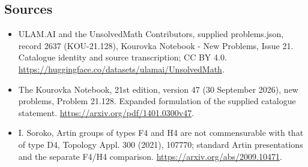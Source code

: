 \documentclass[11pt,a4paper]{article}
\begin{document}
\subsection{Sources}
\begin{itemize}
\item[S1] ULAM.AI and the UnsolvedMath Contributors, supplied problems.json, record 2637 (KOU-21.128), Kourovka Notebook - New Problems, Issue 21. Catalogue identity and source transcription; CC BY 4.0.
\url{https://huggingface.co/datasets/ulamai/UnsolvedMath}.
\item[S2] The Kourovka Notebook, 21st edition, version 47 (30 September 2026), new problems, Problem 21.128. Expanded formulation of the supplied catalogue statement.
\url{https://arxiv.org/pdf/1401.0300v47}.
\item[S3] I. Soroko, Artin groups of types F4 and H4 are not commensurable with that of type D4, Topology Appl. 300 (2021), 107770; standard Artin presentations and the separate F4/H4 comparison.
\url{https://arxiv.org/abs/2009.10471}.
\end{itemize}
\end{document}
